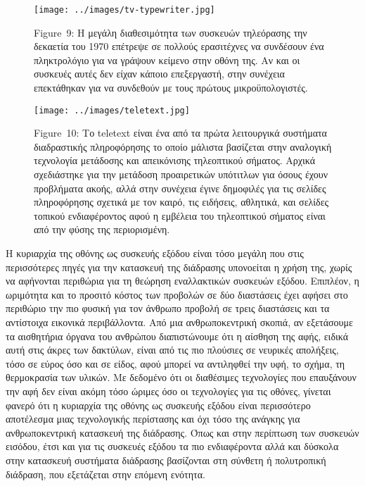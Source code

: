 \documentclass[
]{article}
\begin{document}
\leavevmode{}%
\begin{figure}
\hypertarget{fig:tv-typewriter}{%
\centering
\texttt{[image: ../images/tv-typewriter.jpg]}
\caption{Figure~9: Η μεγάλη διαθεσιμότητα των συσκευών τηλεόρασης την
δεκαετία του 1970 επέτρεψε σε πολλούς ερασιτέχνες να συνδέσουν ένα
πληκτρολόγιο για να γράψουν κείμενο στην οθόνη της. Αν και οι συσκευές
αυτές δεν είχαν κάποιο επεξεργαστή, στην συνέχεια επεκτάθηκαν για να
συνδεθούν με τους πρώτους μικροϋπολογιστές.}\label{fig:tv-typewriter}
}
\end{figure}

\leavevmode{}%
\begin{figure}
\hypertarget{fig:teletext}{%
\centering
\texttt{[image: ../images/teletext.jpg]}
\caption{Figure~10: Το teletext είναι ένα από τα πρώτα λειτουργικά
συστήματα διαδραστικής πληροφόρησης το οποίο μάλιστα βασίζεται στην
αναλογική τεχνολογία μετάδοσης και απεικόνισης τηλεοπτικού σήματος.
Αρχικά σχεδιάστηκε για την μετάδοση προαιρετικών υπότιτλων για όσους
έχουν προβλήματα ακοής, αλλά στην συνέχεια έγινε δημοφιλές για τις
σελίδες πληροφόρησης σχετικά με τον καιρό, τις ειδήσεις, αθλητικά, και
σελίδες τοπικού ενδιαφέροντος αφού η εμβέλεια του τηλεοπτικού σήματος
είναι από την φύσης της περιορισμένη.}\label{fig:teletext}
}
\end{figure}

Η κυριαρχία της οθόνης ως συσκευής εξόδου είναι τόσο μεγάλη που στις
περισσότερες πηγές για την κατασκευή της διάδρασης υπονοείται η χρήση
της, χωρίς να αφήνονται περιθώρια για τη θεώρηση εναλλακτικών συσκευών
εξόδου. Επιπλέον, η ωριμότητα και το προσιτό κόστος των προβολών σε δύο
διαστάσεις έχει αφήσει στο περιθώριο την πιο φυσική για τον άνθρωπο
προβολή σε τρεις διαστάσεις και τα αντίστοιχα εικονικά περιβάλλοντα. Από
μια ανθρωποκεντρική σκοπιά, αν εξετάσουμε τα αισθητήρια όργανα του
ανθρώπου διαπιστώνουμε ότι η αίσθηση της αφής, ειδικά αυτή στις άκρες
των δακτύλων, είναι από τις πιο πλούσιες σε νευρικές απολήξεις, τόσο σε
εύρος όσο και σε είδος, αφού μπορεί να αντιληφθεί την υφή, το σχήμα, τη
θερμοκρασία των υλικών. Με δεδομένο ότι οι διαθέσιμες τεχνολογίες που
επαυξάνουν την αφή δεν είναι ακόμη τόσο ώριμες όσο οι τεχνολογίες για
τις οθόνες, γίνεται φανερό ότι η κυριαρχία της οθόνης ως συσκευής εξόδου
είναι περισσότερο αποτέλεσμα μιας τεχνολογικής περίστασης και όχι τόσο
της ανάγκης για ανθρωποκεντρική κατασκευή της διάδρασης. Όπως και στην
περίπτωση των συσκευών εισόδου, έτσι και για τις συσκευές εξόδου τα πιο
ενδιαφέροντα αλλά και δύσκολα στην κατασκευή συστήματα διάδρασης
βασίζονται στη σύνθετη ή πολυτροπική διάδραση, που εξετάζεται στην
επόμενη ενότητα.
\end{document}
